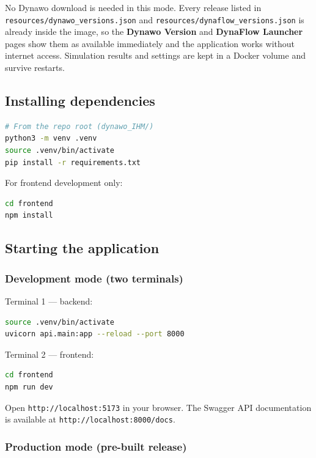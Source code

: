 \documentclass[a4paper,11pt]{article}
\newcommand{\code}[1]{\texttt{\small #1}}
\begin{document}
\begin{notebox}
No Dynawo download is needed in this mode. Every release listed in
\code{resources/dynawo\_versions.json} and
\code{resources/dynaflow\_versions.json} is already inside the image, so the
\textbf{Dynawo Version} and \textbf{DynaFlow Launcher} pages show them as
available immediately and the application works without internet access.
Simulation results and settings are kept in a Docker volume and survive
restarts.
\end{notebox}

\subsection{Installing dependencies}

\begin{lstlisting}[language=bash]
# From the repo root (dynawo_IHM/)
python3 -m venv .venv
source .venv/bin/activate
pip install -r requirements.txt
\end{lstlisting}

For frontend development only:

\begin{lstlisting}[language=bash]
cd frontend
npm install
\end{lstlisting}

\subsection{Starting the application}

\subsubsection{Development mode (two terminals)}

Terminal 1 --- backend:
\begin{lstlisting}[language=bash]
source .venv/bin/activate
uvicorn api.main:app --reload --port 8000
\end{lstlisting}

Terminal 2 --- frontend:
\begin{lstlisting}[language=bash]
cd frontend
npm run dev
\end{lstlisting}

Open \code{http://localhost:5173} in your browser.
The Swagger API documentation is available at \code{http://localhost:8000/docs}.

\subsubsection{Production mode (pre-built release)}
\end{document}
